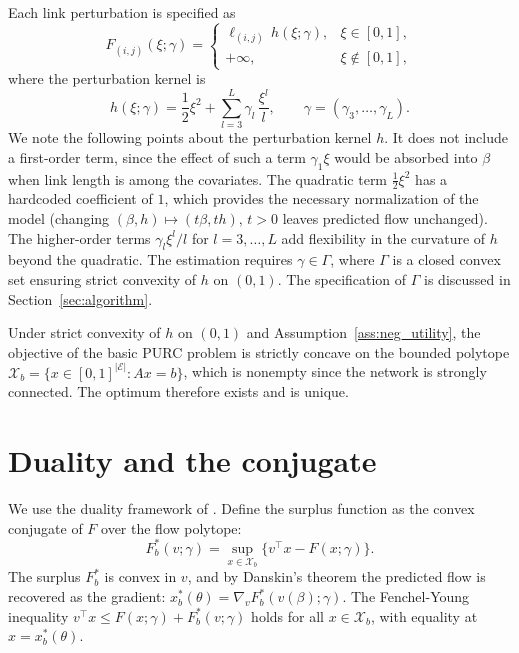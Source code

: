 \documentclass[12pt]{article}
\newcommand{\cE}{\mathcal{E}}
\newcommand{\cX}{\mathcal{X}}
\begin{document}
Each link perturbation is specified as
\[
    F_{(i,j)}(\xi; \gamma) = \begin{cases}
        \ell_{(i,j)} \, h(\xi; \gamma), & \xi \in [0, 1], \\
        +\infty, & \xi \notin [0,1],
    \end{cases}
\]
where the perturbation kernel is
\begin{equation}\label{eq:h-def}
    h(\xi; \gamma) = \frac{1}{2}\xi^2
    + \sum_{l=3}^{L} \gamma_l \, \frac{\xi^l}{l},
    \qquad \gamma = (\gamma_3, \ldots, \gamma_L).
\end{equation}
We note the following points about the perturbation kernel $h$. It does not include a first-order term, since the effect of such a term $\gamma_1 \xi$ would be absorbed into $\beta$ when link length is among the covariates. The quadratic term $\frac{1}{2}\xi^2$ has a hardcoded coefficient of $1$, which provides the necessary normalization of the model (changing $(\beta, h) \mapsto (t\beta, th),\, t>0$ leaves predicted flow unchanged). The higher-order terms $\gamma_l \xi^l / l$ for $l = 3, \ldots, L$ add flexibility in the curvature of $h$ beyond the quadratic. The estimation requires $\gamma \in \Gamma$, where $\Gamma$ is a closed convex set ensuring strict convexity of $h$ on $(0,1)$. The specification of $\Gamma$ is discussed in Section~\ref{sec:algorithm}.

Under strict convexity of $h$ on $(0, 1)$ and Assumption~\ref{ass:neg_utility}, the objective of the basic PURC problem is strictly concave on the bounded polytope $\cX_b = \{x \in [0, 1]^{|\cE|} : Ax = b\}$, which is nonempty since the network is strongly connected. The optimum therefore exists and is unique.



\section{Duality and the conjugate}\label{sec:duality_conjugate}

We use the duality framework of \citet{fosgerau_convex_2026}. Define the surplus function as the convex conjugate of $F$ over the flow polytope:
\[
    F^*_b(v; \gamma) = \sup_{x \in \cX_b}
        \bigl\{ v^\top x - F(x; \gamma) \bigr\}.
\]
The surplus $F^*_b$ is convex in $v$, and by Danskin's theorem the predicted flow is recovered as the gradient: $x^*_b(\theta) = \nabla_v F^*_b(v(\beta); \gamma)$. The Fenchel-Young inequality $v^\top x \leq F(x; \gamma) + F^*_b(v; \gamma)$ holds for all $x \in \cX_b$, with equality at $x = x^*_b(\theta)$.
\end{document}
